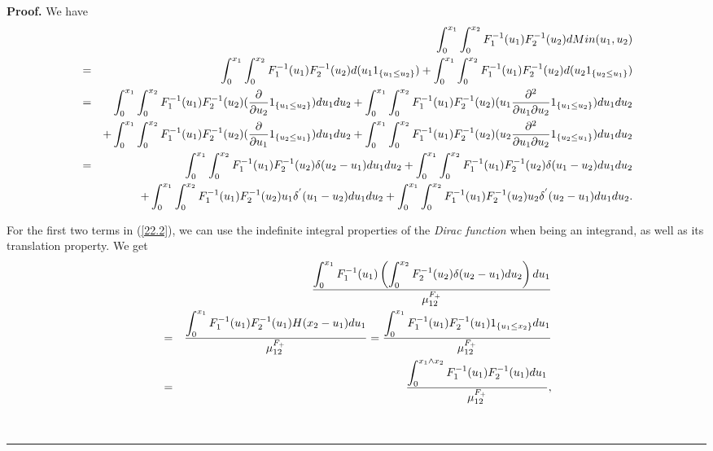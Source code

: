 \documentclass[onecolumn]{article}
\providecommand{\dint}{\displaystyle\int}
\newenvironment{proof}[1][Proof]{\noindent\textbf{#1.} }{\ \rule{0.5em}{0.5em}}
\renewcommand{\dint}{\displaystyle\int}
\begin{document}
\begin{proof}
We have%
\begin{eqnarray}
&&\dint\nolimits_{0}^{x_{1}}\dint%
\nolimits_{0}^{x_{2}}F_{1}^{-1}(u_{1})F_{2}^{-1}(u_{2})dMin(u_{1},u_{2}) 
\notag \\
&=&\dint\nolimits_{0}^{x_{1}}\dint%
\nolimits_{0}^{x_{2}}F_{1}^{-1}(u_{1})F_{2}^{-1}(u_{2})d(u_{1}1_{\left\{
u_{1}\leq u_{2}\right\}
})+\dint\nolimits_{0}^{x_{1}}\dint%
\nolimits_{0}^{x_{2}}F_{1}^{-1}(u_{1})F_{2}^{-1}(u_{2})d(u_{2}1_{\left\{
u_{2}\leq u_{1}\right\} })  \notag \\
&=&\dint\nolimits_{0}^{x_{1}}\dint%
\nolimits_{0}^{x_{2}}F_{1}^{-1}(u_{1})F_{2}^{-1}(u_{2})(\frac{\partial }{%
\partial u_{2}}1_{\left\{ u_{1}\leq u_{2}\right\}
})du_{1}du_{2}+\dint\nolimits_{0}^{x_{1}}\dint%
\nolimits_{0}^{x_{2}}F_{1}^{-1}(u_{1})F_{2}^{-1}(u_{2})(u_{1}\frac{\partial
^{2}}{\partial u_{1}\partial u_{2}}1_{\left\{ u_{1}\leq u_{2}\right\}
})du_{1}du_{2}  \notag \\
&&+\dint\nolimits_{0}^{x_{1}}\dint%
\nolimits_{0}^{x_{2}}F_{1}^{-1}(u_{1})F_{2}^{-1}(u_{2})(\frac{\partial }{%
\partial u_{1}}1_{\left\{ u_{2}\leq u_{1}\right\}
})du_{1}du_{2}+\dint\nolimits_{0}^{x_{1}}\dint%
\nolimits_{0}^{x_{2}}F_{1}^{-1}(u_{1})F_{2}^{-1}(u_{2})(u_{2}\frac{\partial
^{2}}{\partial u_{1}\partial u_{2}}1_{\left\{ u_{2}\leq u_{1}\right\}
})du_{1}du_{2}  \notag \\
&=&\dint\nolimits_{0}^{x_{1}}\dint%
\nolimits_{0}^{x_{2}}F_{1}^{-1}(u_{1})F_{2}^{-1}(u_{2})\delta
(u_{2}-u_{1})du_{1}du_{2}+\dint\nolimits_{0}^{x_{1}}\dint%
\nolimits_{0}^{x_{2}}F_{1}^{-1}(u_{1})F_{2}^{-1}(u_{2})\delta
(u_{1}-u_{2})du_{1}du_{2}  \notag \\
&&+\dint\nolimits_{0}^{x_{1}}\dint%
\nolimits_{0}^{x_{2}}F_{1}^{-1}(u_{1})F_{2}^{-1}(u_{2})u_{1}\delta
^{^{\prime
}}(u_{1}-u_{2})du_{1}du_{2}+\dint\nolimits_{0}^{x_{1}}\dint%
\nolimits_{0}^{x_{2}}F_{1}^{-1}(u_{1})F_{2}^{-1}(u_{2})u_{2}\delta
^{^{\prime }}(u_{2}-u_{1})du_{1}du_{2}.  \label{22.2}
\end{eqnarray}

For the first two terms in (\ref{22.2}), we can use the indefinite integral
properties of the \textit{Dirac function} when being an integrand, as well
as its translation property. We get%
\begin{eqnarray}
&&\frac{\dint\nolimits_{0}^{x_{1}}F_{1}^{-1}(u_{1})\left(
\dint\nolimits_{0}^{x_{2}}F_{2}^{-1}(u_{2})\delta (u_{2}-u_{1})du_{2}\right)
du_{1}}{\mu _{12}^{F_{+}}}  \notag \\
&=&\frac{\dint%
\nolimits_{0}^{x_{1}}F_{1}^{-1}(u_{1})F_{2}^{-1}(u_{1})H(x_{2}-u_{1})du_{1}}{%
\mu _{12}^{F_{+}}}=\frac{\dint%
\nolimits_{0}^{x_{1}}F_{1}^{-1}(u_{1})F_{2}^{-1}(u_{1})1_{\left\{ u_{1}\leq
x_{2}\right\} }du_{1}}{\mu _{12}^{F_{+}}}  \notag \\
&=&\frac{\dint\nolimits_{0}^{x_{1}\wedge
x_{2}}F_{1}^{-1}(u_{1})F_{2}^{-1}(u_{1})du_{1}}{\mu _{12}^{F_{+}}},
\label{22}
\end{eqnarray}


\end{proof}
\end{document}
